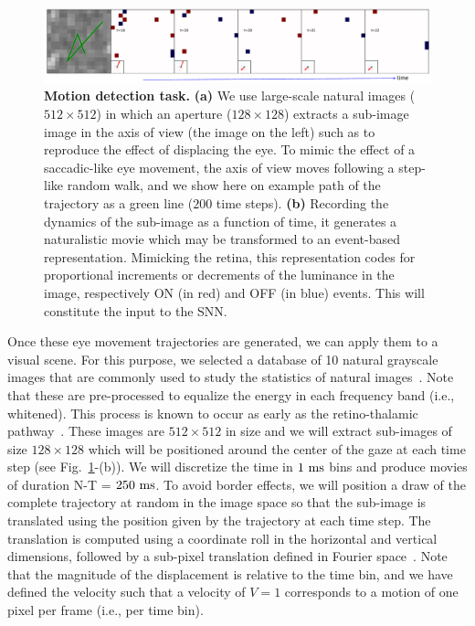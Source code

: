 \documentclass[default]{sn-jnl}%
\theoremstyle{thmstyleone}%
\theoremstyle{thmstyletwo}%
\theoremstyle{thmstylethree}%
\newcommand{\seeFig}[1]{see Fig.~\ref{fig:#1}}%
\begin{document}
\begin{figure}%
    \centering
    \includegraphics[width=0.95\linewidth]{figures/motion_task.pdf}
    \caption{
    {\bf Motion detection task.} {\bf (a)} We use large-scale natural images ($512\times512$) in which an aperture ($128\times128$) extracts a sub-image image in the axis of view (the image on the left) such as to reproduce the effect of displacing the eye. To mimic the effect of a saccadic-like eye movement, the axis of view moves following a step-like random walk, and we show here on example path of the trajectory as a green line ($200$ time steps). {\bf (b)} Recording the dynamics of the sub-image as a function of time, it generates a naturalistic movie which may be transformed to an event-based representation. Mimicking the retina, this representation codes for proportional increments or decrements of the luminance in the image, respectively ON (in red) and OFF (in blue) events. This will constitute the input to the SNN.}
    \label{fig:motion_task}
\end{figure}
Once these eye movement trajectories are generated, we can apply them to a visual scene. For this purpose, we selected a database of 10 natural grayscale images that are commonly used to study the statistics of natural images~\citep{olshausen_emergence_1996}. Note that these are pre-processed to equalize the energy in each frequency band (i.e., whitened). This process is known to occur as early as the retino-thalamic pathway~\citep{dan_efficient_1996}. These images are $512 \times 512$ in size and we will extract sub-images of size $128 \times 128$ which will be positioned around the center of the gaze at each time step (\seeFig{motion_task}-(b)). We will discretize the time in $1~\si{\milli\second}$ bins and produce movies of duration N-T = $250~\si{\milli\second}$. To avoid border effects, we will position a draw of the complete trajectory at random in the image space so that the sub-image is translated using the position given by the trajectory at each time step. The translation is computed using a coordinate roll in the horizontal and vertical dimensions, followed by a sub-pixel translation defined in Fourier space~\citep{perrinet_sparse_2015}. Note that the magnitude of the displacement is relative to the time bin, and we have defined the velocity such that a velocity of $V=1$ corresponds to a motion of one pixel per frame (i.e., per time bin).
\end{document}
